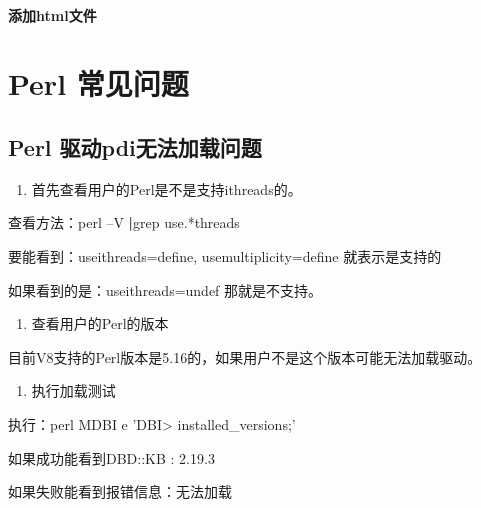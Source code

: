 \documentclass[a4,10pt,oneside,english]{sphinxmanual}
\begin{document}
\paragraph{添加html文件}
\label{\detokenize{interface/thinkPHP:html}}

\section{Perl 常见问题}
\label{\detokenize{interface/perl:perl}}\label{\detokenize{interface/perl::doc}}

\subsection{Perl 驱动pdi无法加载问题}
\label{\detokenize{interface/perl:perl-pdi}}\begin{enumerate}
%
\item {} 
首先查看用户的Perl是不是支持ithreads的。

\end{enumerate}

查看方法：perl –V {\color{red}\bfseries{}|}grep use.*threads

要能看到：useithreads=define, usemultiplicity=define 就表示是支持的

如果看到的是：useithreads=undef 那就是不支持。
\begin{enumerate}
%
\setcounter{enumi}{1}
\item {} 
查看用户的Perl的版本

\end{enumerate}

目前V8支持的Perl版本是5.16的，如果用户不是这个版本可能无法加载驱动。
\begin{enumerate}
%
\setcounter{enumi}{2}
\item {} 
执行加载测试

\end{enumerate}

执行：perl \sphinxhyphen{}MDBI \sphinxhyphen{}e 'DBI\sphinxhyphen{}> installed\_versions;'

如果成功能看到DBD::KB         : 2.19.3

如果失败能看到报错信息：无法加载

\begin{figure}[H]
\centering

\noindent{}
\end{figure}
\end{document}
